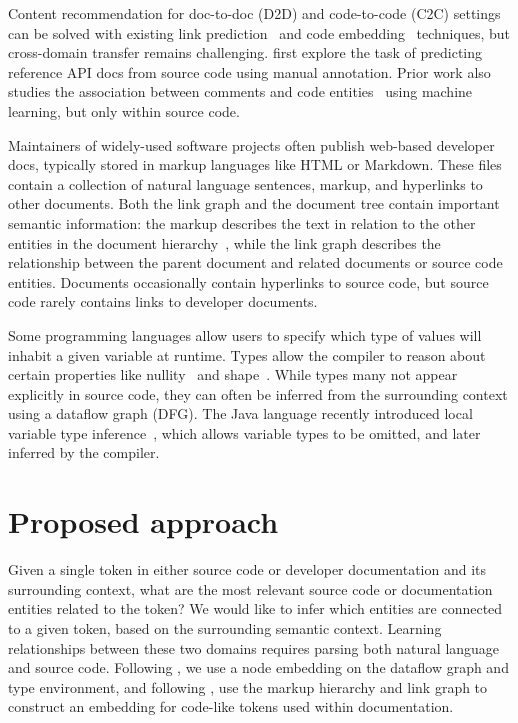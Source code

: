\documentclass{article}
\begin{document}
Content recommendation for doc-to-doc (D2D) and code-to-code (C2C) settings can be solved with existing link prediction~\citep{zhang2018link} and code embedding~\citep{gu2018deep} techniques, but cross-domain transfer remains challenging. \citet{robillard2015recommending, robillard2017demand} first explore the task of predicting reference API docs from source code using manual annotation. Prior work also studies the association between comments and code entities~\citep{panthaplackel2020associating} using machine learning, but only within source code.

Maintainers of widely-used software projects often publish web-based developer docs, typically stored in markup languages like HTML or Markdown. These files contain a collection of natural language sentences, markup, and hyperlinks to other documents. Both the link graph and the document tree contain important semantic information: the markup describes the text in relation to the other entities in the document hierarchy~\citep{yang2016hierarchical}, while the link graph describes the relationship between the parent document and related documents or source code entities. Documents occasionally contain hyperlinks to source code, but source code rarely contains links to developer documents.

Some programming languages allow users to specify which type of values will inhabit a given variable at runtime. Types allow the compiler to reason about certain properties like nullity~\citep{ekman2007pluggable} and shape~\citep{considine2019kotlingrad}. While types many not appear explicitly in source code, they can often be inferred from the surrounding context using a dataflow graph (DFG). The Java language recently introduced local variable type inference~\citet{liddell2019analyzing}, which allows variable types to be omitted, and later inferred by the compiler.

\section{Proposed approach}

Given a single token in either source code or developer documentation and its surrounding context, what are the most relevant source code or documentation entities related to the token? We would like to infer which entities are connected to a given token, based on the surrounding semantic context. Learning relationships between these two domains requires parsing both natural language and source code. Following \citet{si2018learning, gu2018deep, liu2019neural}, we use a node embedding on the dataflow graph and type environment, and following \citet{yang2016hierarchical, zhang2018link}, use the markup hierarchy and link graph to construct an embedding for code-like tokens used within documentation.
\end{document}
